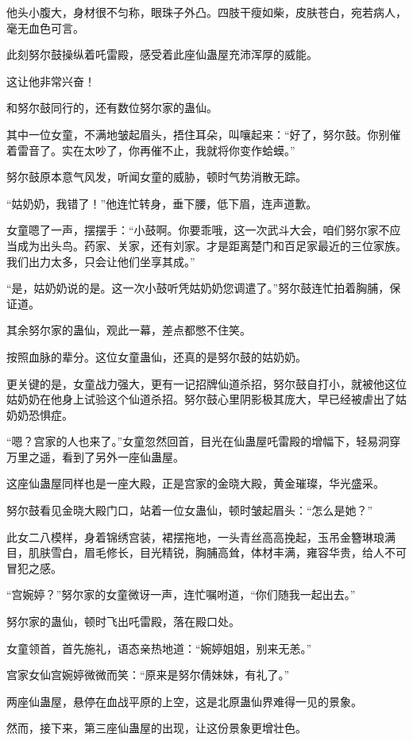 \begin{this_body}
他头小腹大，身材很不匀称，眼珠子外凸。四肢干瘦如柴，皮肤苍白，宛若病人，毫无血色可言。

此刻努尔鼓操纵着吒雷殿，感受着此座仙蛊屋充沛浑厚的威能。

这让他非常兴奋！

和努尔鼓同行的，还有数位努尔家的蛊仙。

其中一位女童，不满地皱起眉头，捂住耳朵，叫嚷起来：“好了，努尔鼓。你别催着雷音了。实在太吵了，你再催不止，我就将你变作蛤蟆。”

努尔鼓原本意气风发，听闻女童的威胁，顿时气势消散无踪。

“姑奶奶，我错了！”他连忙转身，垂下腰，低下眉，连声道歉。

女童嗯了一声，摆摆手：“小鼓啊。你要乖哦，这一次武斗大会，咱们努尔家不应当成为出头鸟。药家、关家，还有刘家。才是距离楚门和百足家最近的三位家族。我们出力太多，只会让他们坐享其成。”

“是，姑奶奶说的是。这一次小鼓听凭姑奶奶您调遣了。”努尔鼓连忙拍着胸脯，保证道。

其余努尔家的蛊仙，观此一幕，差点都憋不住笑。

按照血脉的辈分。这位女童蛊仙，还真的是努尔鼓的姑奶奶。

更关键的是，女童战力强大，更有一记招牌仙道杀招，努尔鼓自打小，就被他这位姑奶奶在他身上试验这个仙道杀招。努尔鼓心里阴影极其庞大，早已经被虐出了姑奶奶恐惧症。

“嗯？宫家的人也来了。”女童忽然回首，目光在仙蛊屋吒雷殿的增幅下，轻易洞穿万里之遥，看到了另外一座仙蛊屋。

这座仙蛊屋同样也是一座大殿，正是宫家的金晓大殿，黄金璀璨，华光盛采。

努尔鼓看见金晓大殿门口，站着一位女蛊仙，顿时皱起眉头：“怎么是她？”

此女二八模样，身着锦绣宫装，裙摆拖地，一头青丝高高挽起，玉吊金簪琳琅满目，肌肤雪白，眉毛修长，目光精锐，胸脯高耸，体材丰满，雍容华贵，给人不可冒犯之感。

“宫婉婷？”努尔家的女童微讶一声，连忙嘱咐道，“你们随我一起出去。”

努尔家的蛊仙，顿时飞出吒雷殿，落在殿口处。

女童领首，首先施礼，语态亲热地道：“婉婷姐姐，别来无恙。”

宫家女仙宫婉婷微微而笑：“原来是努尔倩妹妹，有礼了。”

两座仙蛊屋，悬停在血战平原的上空，这是北原蛊仙界难得一见的景象。

然而，接下来，第三座仙蛊屋的出现，让这份景象更增壮色。


\end{this_body}
